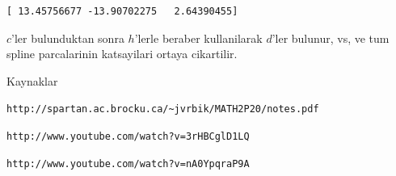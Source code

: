 \documentclass[12pt,fleqn]{article}\usepackage{../common}
\begin{document}
\begin{verbatim}
[ 13.45756677 -13.90702275   2.64390455]
\end{verbatim}

$c$'ler bulunduktan sonra $h$'lerle beraber kullanilarak $d$'ler bulunur,
vs, ve tum spline parcalarinin katsayilari ortaya cikartilir.

Kaynaklar

\verb!http://spartan.ac.brocku.ca/~jvrbik/MATH2P20/notes.pdf!

\verb!http://www.youtube.com/watch?v=3rHBCglD1LQ!

\verb!http://www.youtube.com/watch?v=nA0YpqraP9A!
\end{document}
